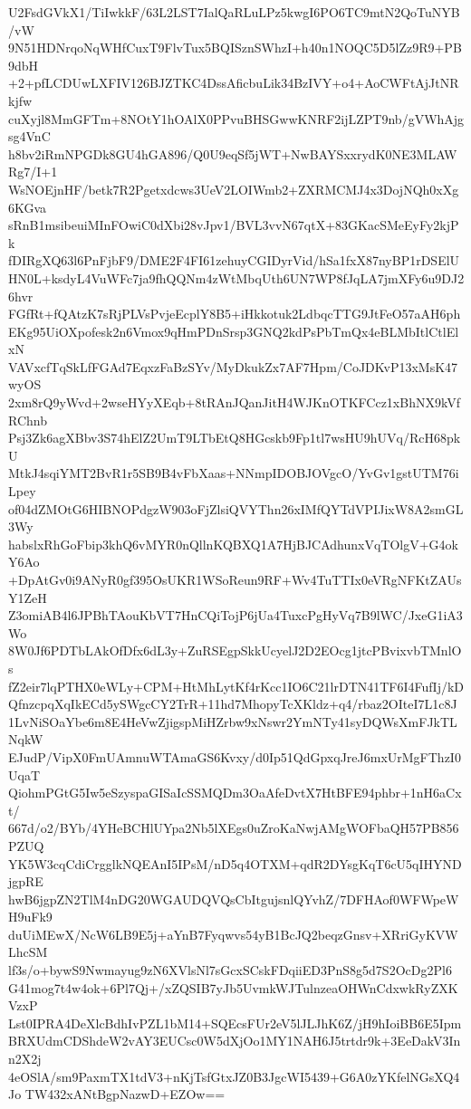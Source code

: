 U2FsdGVkX1/TiIwkkF/63L2LST7IalQaRLuLPz5kwgI6PO6TC9mtN2QoTuNYB/vW
9N51HDNrqoNqWHfCuxT9FlvTux5BQISznSWhzI+h40n1NOQC5D5lZz9R9+PB9dbH
+2+pfLCDUwLXFIV126BJZTKC4DssAficbuLik34BzIVY+o4+AoCWFtAjJtNRkjfw
cuXyjl8MmGFTm+8NOtY1hOAlX0PPvuBHSGwwKNRF2ijLZPT9nb/gVWhAjgsg4VnC
h8bv2iRmNPGDk8GU4hGA896/Q0U9eqSf5jWT+NwBAYSxxrydK0NE3MLAWRg7/I+1
WsNOEjnHF/betk7R2Pgetxdcws3UeV2LOIWmb2+ZXRMCMJ4x3DojNQh0xXg6KGva
sRnB1msibeuiMInFOwiC0dXbi28vJpv1/BVL3vvN67qtX+83GKacSMeEyFy2kjPk
fDIRgXQ63l6PnFjbF9/DME2F4FI61zehuyCGIDyrVid/hSa1fxX87nyBP1rDSElU
HN0L+ksdyL4VuWFc7ja9fhQQNm4zWtMbqUth6UN7WP8fJqLA7jmXFy6u9DJ26hvr
FGfRt+fQAtzK7sRjPLVsPvjeEcplY8B5+iHkkotuk2LdbqcTTG9JtFeO57aAH6ph
EKg95UiOXpofesk2n6Vmox9qHmPDnSrsp3GNQ2kdPsPbTmQx4eBLMbItlCtlElxN
VAVxcfTqSkLfFGAd7EqxzFaBzSYv/MyDkukZx7AF7Hpm/CoJDKvP13xMsK47wyOS
2xm8rQ9yWvd+2wseHYyXEqb+8tRAnJQanJitH4WJKnOTKFCcz1xBhNX9kVfRChnb
Psj3Zk6agXBbv3S74hElZ2UmT9LTbEtQ8HGcskb9Fp1tl7wsHU9hUVq/RcH68pkU
MtkJ4sqiYMT2BvR1r5SB9B4vFbXaas+NNmpIDOBJOVgcO/YvGv1gstUTM76iLpey
of04dZMOtG6HIBNOPdgzW903oFjZlsiQVYThn26xIMfQYTdVPIJixW8A2smGL3Wy
habslxRhGoFbip3khQ6vMYR0nQllnKQBXQ1A7HjBJCAdhunxVqTOlgV+G4okY6Ao
+DpAtGv0i9ANyR0gf395OsUKR1WSoReun9RF+Wv4TuTTIx0eVRgNFKtZAUsY1ZeH
Z3omiAB4l6JPBhTAouKbVT7HnCQiTojP6jUa4TuxcPgHyVq7B9lWC/JxeG1iA3Wo
8W0Jf6PDTbLAkOfDfx6dL3y+ZuRSEgpSkkUcyelJ2D2EOcg1jtcPBvixvbTMnlOs
fZ2eir7lqPTHX0eWLy+CPM+HtMhLytKf4rKcc1IO6C21lrDTN41TF6I4FufIj/kD
QfnzcpqXqIkECd5ySWgcCY2TrR+11hd7MhopyTcXKldz+q4/rbaz2OIteI7L1c8J
1LvNiSOaYbe6m8E4HeVwZjigspMiHZrbw9xNswr2YmNTy41syDQWsXmFJkTLNqkW
EJudP/VipX0FmUAmnuWTAmaGS6Kvxy/d0Ip51QdGpxqJreJ6mxUrMgFThzI0UqaT
QiohmPGtG5Iw5eSzyspaGISaIcSSMQDm3OaAfeDvtX7HtBFE94phbr+1nH6aCxt/
667d/o2/BYb/4YHeBCHlUYpa2Nb5lXEgs0uZroKaNwjAMgWOFbaQH57PB856PZUQ
YK5W3cqCdiCrgglkNQEAnI5IPsM/nD5q4OTXM+qdR2DYsgKqT6cU5qIHYNDjgpRE
hwB6jgpZN2TlM4nDG20WGAUDQVQsCbItgujsnlQYvhZ/7DFHAof0WFWpeWH9uFk9
duUiMEwX/NcW6LB9E5j+aYnB7Fyqwvs54yB1BcJQ2beqzGnsv+XRriGyKVWLhcSM
lf3s/o+bywS9Nwmayug9zN6XVlsNl7sGcxSCskFDqiiED3PnS8g5d7S2OcDg2Pl6
G41mog7t4w4ok+6Pl7Qj+/xZQSIB7yJb5UvmkWJTulnzeaOHWnCdxwkRyZXKVzxP
Lst0IPRA4DeXlcBdhIvPZL1bM14+SQEcsFUr2eV5lJLJhK6Z/jH9hIoiBB6E5Ipm
BRXUdmCDShdeW2vAY3EUCsc0W5dXjOo1MY1NAH6J5trtdr9k+3EeDakV3Inn2X2j
4eOSlA/sm9PaxmTX1tdV3+nKjTsfGtxJZ0B3JgcWI5439+G6A0zYKfelNGsXQ4Jo
TW432xANtBgpNazwD+EZOw==
